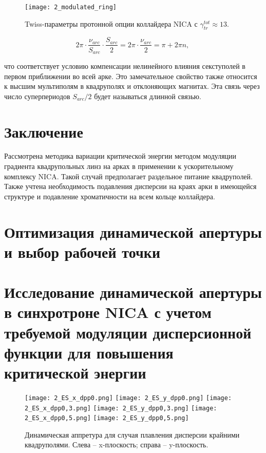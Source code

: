 \begin{figure}
   \texttt{[image: 2\_modulated\_ring]}
   \caption{Twiss-параметры протонной опции коллайдера NICA с $\gamma_{tr}^{tot}\approx13$.}
   \label{fig:2_modulated_ring}
\end{figure}

\begin{equation}
2\pi\cdot\frac{\nu_{arc}}{S_{arc}}\cdot\frac{S_{arc}}{2}=2\pi\cdot\frac{\nu_{arc}}{2}=\pi+2\pi n,\
\label{eq:chrom_period}
\end{equation}

что соответствует условию компенсации нелинейного влияния секступолей в первом приближении во всей арке. Это замечательное свойство также относится к высшим мультиполям в квадруполях и отклоняющих магнитах. Эта связь через число суперпериодов $S_{arc}/2$ будет называться длинной связью.

\section{Заключение}

\par Рассмотрена методика вариации критической энергии методом модуляции градиента квадрупольных линз на арках в применении к ускорительному комплексу NICA. Такой случай предполагает раздельное питание квадруполей. Также учтена необходимость подавления дисперсии на краях арки в имеющейся структуре и подавление хроматичности на всем кольце коллайдера.

\section{Оптимизация динамической апертуры и выбор рабочей точки}\label{sec:transition_variation/methods/DA_optimization}

\section{Исследование динамической апертуры в синхротроне NICA с учетом требуемой модуляции дисперсионной функции для повышения критической энергии}

\begin{figure} [h!]
   \center
   \texttt{[image: 2\_ES\_x\_dpp0.png]}
   \texttt{[image: 2\_ES\_y\_dpp0.png]}
   \texttt{[image: 2\_ES\_x\_dpp0,3.png]}
   \texttt{[image: 2\_ES\_y\_dpp0,3.png]}
   \texttt{[image: 2\_ES\_x\_dpp0,5.png]}
   \texttt{[image: 2\_ES\_y\_dpp0,5.png]}
   \caption{Динамическая аппретура для случая плавления дисперсии крайними квадруполями. 
Слева – x-плоскость; справа – y-плоскость.}
   \label{fig:DA_ES_dpp}
\end{figure}	

